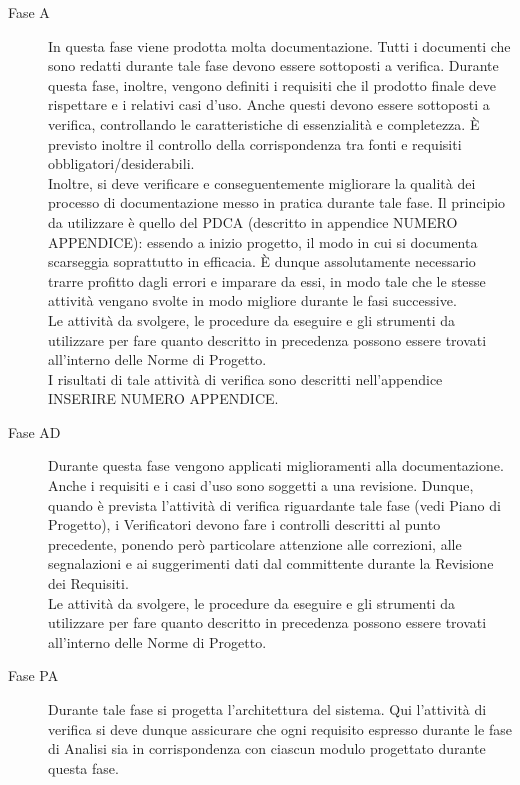 		\begin{description}
			\item[Fase A] In questa fase viene prodotta molta documentazione. Tutti i documenti che sono redatti durante tale fase devono essere 
			sottoposti a verifica. Durante questa fase, inoltre, vengono definiti i requisiti che il prodotto finale deve rispettare e i relativi casi 
			d'uso. Anche questi devono essere sottoposti a verifica, controllando le caratteristiche di essenzialità e completezza. È previsto inoltre 
			il controllo della corrispondenza tra fonti e requisiti obbligatori/desiderabili.\\
			Inoltre, si deve verificare e conseguentemente migliorare la qualità dei processo di documentazione messo in pratica durante tale fase. Il 
			principio da utilizzare è quello del PDCA (descritto in appendice NUMERO APPENDICE): essendo a inizio progetto, il modo in cui si documenta 
			scarseggia soprattutto in efficacia. È dunque assolutamente necessario trarre profitto dagli errori e imparare da essi, in modo tale che le 
			stesse attività vengano svolte in modo migliore durante le fasi successive.\\
			Le attività da svolgere, le procedure da eseguire e gli strumenti da utilizzare per fare quanto descritto in precedenza possono essere trovati 
			all'interno delle Norme di Progetto.\\
			I risultati di tale attività di verifica sono descritti nell'appendice INSERIRE NUMERO APPENDICE.
			\item[Fase AD] Durante questa fase vengono applicati miglioramenti alla documentazione. Anche i requisiti e i casi d'uso 
			sono soggetti a una revisione. Dunque, quando è prevista l'attività di verifica riguardante tale fase (vedi Piano di Progetto), i Verificatori 
			devono fare i controlli descritti al punto precedente, ponendo però particolare attenzione alle correzioni, alle segnalazioni e ai suggerimenti 
			dati dal committente durante la Revisione dei Requisiti.\\
			Le attività da svolgere, le procedure da eseguire e gli strumenti da utilizzare per fare quanto descritto in precedenza possono essere trovati 
			all'interno delle Norme di Progetto.
			\item[Fase PA] Durante tale fase si progetta l'architettura del sistema. Qui l'attività di verifica si deve dunque assicurare che ogni requisito 
			espresso durante le fase di Analisi sia in corrispondenza con ciascun modulo progettato durante questa fase.\\

\end{description}
